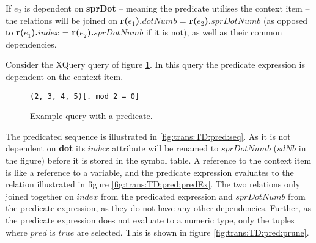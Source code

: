 If $e_2$ is dependent on \textbf{sprDot} -- meaning the predicate utilises the context item -- the relations will
be joined on \textbf{r(}$e_1$\textbf{).}$dotNumb$ \textsf{=} \textbf{r(}$e_2$\textbf{).}$sprDotNumb$ (as opposed
to \textbf{r(}$e_1$\textbf{).}$index$ \textsf{=} \textbf{r(}$e_2$\textbf{).}$sprDotNumb$ if it is not), as well as
their common dependencies.

\begin{myExample}
Consider the XQuery query of figure \ref{fig:trans:TD:predQu}. In this query the predicate expression is dependent
on the context item.
\begin{figure}[h]
\centering
\verb!(2, 3, 4, 5)[. mod 2 = 0]!
\caption{Example query with a predicate. \label{fig:trans:TD:predQu}}
\end{figure}

The predicated sequence is illustrated in \ref{fig:trans:TD:pred:seq}. As it is not dependent on \textbf{dot} its
$index$ attribute will be renamed to $sprDotNumb$ ($sdNb$ in the figure) before it is stored in the symbol table. A
reference to the context item is like a reference to a variable, and the predicate expression evaluates to the
relation illustrated in figure \ref{fig:trans:TD:pred:predEx}. The two relations only joined together on $index$
from the predicated expression and $sprDotNumb$ from the predicate expression, as they do not have any other
dependencies. Further, as the predicate expression does not evaluate to a numeric type, only the tuples where
$pred$ is $true$ are selected. This is shown in figure \ref{fig:trans:TD:pred:prune}.


\end{myExample}
